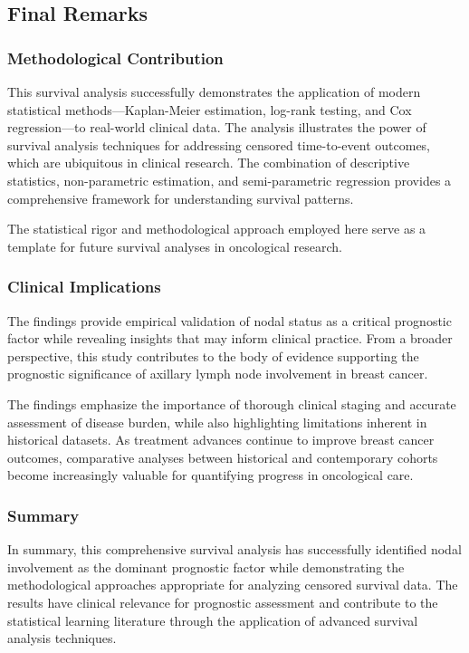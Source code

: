 \documentclass[12pt,a4paper]{article}
\begin{document}
\subsection{Final Remarks}

\subsubsection{Methodological Contribution}

This survival analysis successfully demonstrates the application of modern statistical methods—Kaplan-Meier estimation, log-rank testing, and Cox regression—to real-world clinical data. The analysis illustrates the power of survival analysis techniques for addressing censored time-to-event outcomes, which are ubiquitous in clinical research. The combination of descriptive statistics, non-parametric estimation, and semi-parametric regression provides a comprehensive framework for understanding survival patterns.

The statistical rigor and methodological approach employed here serve as a template for future survival analyses in oncological research.

\subsubsection{Clinical Implications}

The findings provide empirical validation of nodal status as a critical prognostic factor while revealing insights that may inform clinical practice. From a broader perspective, this study contributes to the body of evidence supporting the prognostic significance of axillary lymph node involvement in breast cancer.

The findings emphasize the importance of thorough clinical staging and accurate assessment of disease burden, while also highlighting limitations inherent in historical datasets. As treatment advances continue to improve breast cancer outcomes, comparative analyses between historical and contemporary cohorts become increasingly valuable for quantifying progress in oncological care.

\subsubsection{Summary}

In summary, this comprehensive survival analysis has successfully identified nodal involvement as the dominant prognostic factor while demonstrating the methodological approaches appropriate for analyzing censored survival data. The results have clinical relevance for prognostic assessment and contribute to the statistical learning literature through the application of advanced survival analysis techniques.
\end{document}
